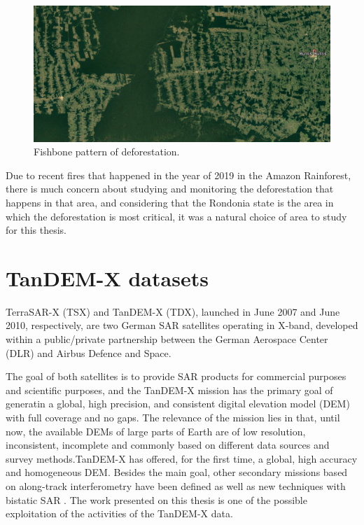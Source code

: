 \begin{figure}[H]
    \centering
    \includegraphics[width=0.8\linewidth]{Chapter2-real/fishbone.png}
    \caption{Fishbone pattern of deforestation.}
    \label{fig:fishbone}
\end{figure}{}

Due to recent fires that happened in the year of 2019 in the Amazon Rainforest, there is much concern about studying and monitoring the deforestation that happens in that area, and considering that the Rondonia state is the area in which the deforestation is most critical, it was a natural choice of area to study for this thesis. 

\section{TanDEM-X datasets}
TerraSAR-X (TSX) and TanDEM-X (TDX), launched in June 2007 and June 2010, respectively, are two German SAR satellites operating in X-band, developed within a public/private partnership
between the German Aerospace Center (DLR) and Airbus Defence and Space. 


The goal of both satellites is to provide SAR products for commercial purposes and scientific purposes, and the TanDEM-X mission has the primary goal of generatin a global, high precision, and consistent digital elevation model (DEM) with full coverage and no gaps. The relevance of the mission lies in that, until now, the available DEMs
of large parts of Earth are of low resolution, inconsistent, incomplete and commonly
based on different data sources and survey methods.\newline TanDEM-X has offered, for the first
time, a global, high accuracy and homogeneous DEM. Besides the main goal, other secondary missions based on along-track interferometry have been defined as well
as new techniques with bistatic SAR \cite{vintetres, vintequatro}. The work presented on this thesis is one of the possible exploitation of the activities of the TanDEM-X data.

